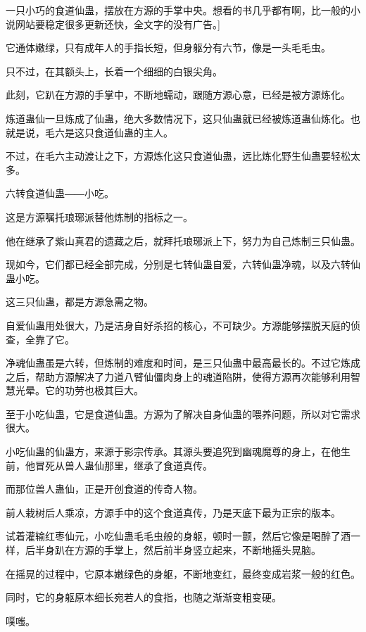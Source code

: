 
\begin{this_body}

一只小巧的食道仙蛊，摆放在方源的手掌中央。想看的书几乎都有啊，比一般的小说网站要稳定很多更新还快，全文字的没有广告。]

它通体嫩绿，只有成年人的手指长短，但身躯分有六节，像是一头毛毛虫。

只不过，在其额头上，长着一个细细的白银尖角。

此刻，它趴在方源的手掌中，不断地蠕动，跟随方源心意，已经是被方源炼化。

炼道蛊仙一旦炼成了仙蛊，绝大多数情况下，这只仙蛊就已经被炼道蛊仙炼化。也就是说，毛六是这只食道仙蛊的主人。

不过，在毛六主动渡让之下，方源炼化这只食道仙蛊，远比炼化野生仙蛊要轻松太多。

六转食道仙蛊――小吃。

这是方源嘱托琅琊派替他炼制的指标之一。

他在继承了紫山真君的遗藏之后，就拜托琅琊派上下，努力为自己炼制三只仙蛊。

现如今，它们都已经全部完成，分别是七转仙蛊自爱，六转仙蛊净魂，以及六转仙蛊小吃。

这三只仙蛊，都是方源急需之物。

自爱仙蛊用处很大，乃是洁身自好杀招的核心，不可缺少。方源能够摆脱天庭的侦查，全靠了它。

净魂仙蛊虽是六转，但炼制的难度和时间，是三只仙蛊中最高最长的。不过它炼成之后，帮助方源解决了力道八臂仙僵肉身上的魂道陷阱，使得方源再次能够利用智慧光晕。它的功劳也极其巨大。

至于小吃仙蛊，它是食道仙蛊。方源为了解决自身仙蛊的喂养问题，所以对它需求很大。

小吃仙蛊的仙蛊方，来源于影宗传承。其源头要追究到幽魂魔尊的身上，在他生前，他冒死从兽人蛊仙那里，继承了食道真传。

而那位兽人蛊仙，正是开创食道的传奇人物。

前人栽树后人乘凉，方源手中的这个食道真传，乃是天底下最为正宗的版本。

试着灌输红枣仙元，小吃仙蛊毛毛虫般的身躯，顿时一颤，然后它像是喝醉了酒一样，后半身趴在方源的手掌上，然后前半身竖立起来，不断地摇头晃脑。

在摇晃的过程中，它原本嫩绿色的身躯，不断地变红，最终变成岩浆一般的红色。

同时，它的身躯原本细长宛若人的食指，也随之渐渐变粗变硬。

噗嗤。


\end{this_body}
